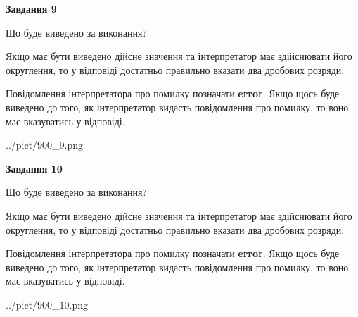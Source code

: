 \documentclass[12pt, ukrainian]{article}
\begin{document}
{\begin {Large}
{\begin {center}\textbf{Завдання 9}\end {center}}\par
Що буде виведено за виконання? \par

Якщо має бути виведено дійсне значення та інтерпретатор має здійснювати його округлення, 
то у відповіді достатньо правильно вказати два дробових розряди.

Повідомлення інтерпретатора про помилку позначати \textbf{error}.
Якщо щось буде виведено до того, як інтерпретатор видасть повідомлення про помилку, 
то воно має вказуватись у відповіді. \par

\begin{center}
	{../pict/900_9.png}
\end{center}
\newpage

{\begin {center}\textbf{Завдання 10}\end {center}}\par
Що буде виведено за виконання? \par

Якщо має бути виведено дійсне значення та інтерпретатор має здійснювати його округлення, 
то у відповіді достатньо правильно вказати два дробових розряди.

Повідомлення інтерпретатора про помилку позначати \textbf{error}.
Якщо щось буде виведено до того, як інтерпретатор видасть повідомлення про помилку, 
то воно має вказуватись у відповіді. \par

\begin{center}
	{../pict/900_10.png}
\end{center}
\newpage

\end {Large}}
\end{document}
